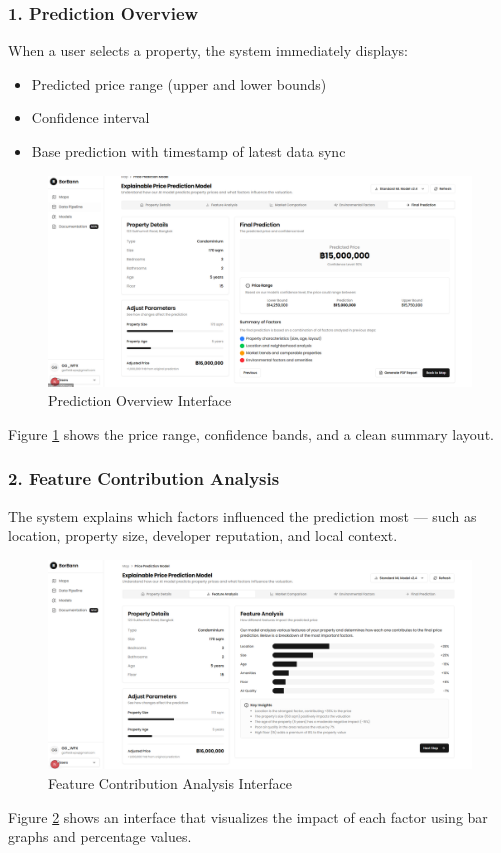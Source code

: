 \subsubsection*{1. Prediction Overview}

When a user selects a property, the system immediately displays:

\begin{itemize}
	\item Predicted price range (upper and lower bounds)
	\item Confidence interval
	\item Base prediction with timestamp of latest data sync
\end{itemize}

\begin{figure}[htbp]
	\centering
	\includegraphics[width=1\textwidth]{assets/ai/price-prediction-1.png}
	\caption{Prediction Overview Interface}
	\label{fig:price-prediction-ui-1}
\end{figure}

Figure \ref{fig:price-prediction-ui-1} shows the price range, confidence bands, and a clean summary layout.

\subsubsection*{2. Feature Contribution Analysis}

The system explains which factors influenced the prediction most — such as location, property size, developer reputation, and local context.

\begin{figure}[htbp]
	\centering
	\includegraphics[width=1\textwidth]{assets/ai/price-prediction-2.png}
	\caption{Feature Contribution Analysis Interface}
	\label{fig:price-prediction-ui-2}
\end{figure}

Figure \ref{fig:price-prediction-ui-2} shows an interface that visualizes the impact of each factor using bar graphs and percentage values.
